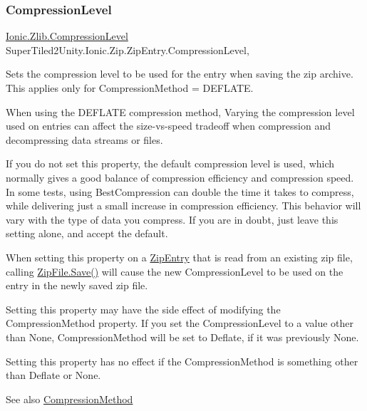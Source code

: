 \subsubsection{\texorpdfstring{Compression\+Level}{CompressionLevel}}
{\footnotesize\ttfamily \mbox{\hyperlink{namespace_super_tiled2_unity_1_1_ionic_1_1_zlib_a20f6771804996c363f454ad9765cd7db}{Ionic.\+Zlib.\+Compression\+Level}} Super\+Tiled2\+Unity.\+Ionic.\+Zip.\+Zip\+Entry.\+Compression\+Level\hspace{0.3cm}{\ttfamily [get]}, {\ttfamily [set]}}



Sets the compression level to be used for the entry when saving the zip archive. This applies only for Compression\+Method = D\+E\+F\+L\+A\+TE. 

When using the D\+E\+F\+L\+A\+TE compression method, Varying the compression level used on entries can affect the size-\/vs-\/speed tradeoff when compression and decompressing data streams or files. 

If you do not set this property, the default compression level is used, which normally gives a good balance of compression efficiency and compression speed. In some tests, using {\ttfamily Best\+Compression} can double the time it takes to compress, while delivering just a small increase in compression efficiency. This behavior will vary with the type of data you compress. If you are in doubt, just leave this setting alone, and accept the default. 

When setting this property on a {\ttfamily \mbox{\hyperlink{class_super_tiled2_unity_1_1_ionic_1_1_zip_1_1_zip_entry}{Zip\+Entry}}} that is read from an existing zip file, calling {\ttfamily \mbox{\hyperlink{class_super_tiled2_unity_1_1_ionic_1_1_zip_1_1_zip_file_aff8f1b3d07b66481e2629b04017a056f}{Zip\+File.\+Save()}}} will cause the new {\ttfamily Compression\+Level} to be used on the entry in the newly saved zip file. 

Setting this property may have the side effect of modifying the {\ttfamily Compression\+Method} property. If you set the {\ttfamily Compression\+Level} to a value other than {\ttfamily None}, {\ttfamily Compression\+Method} will be set to {\ttfamily Deflate}, if it was previously {\ttfamily None}. 

Setting this property has no effect if the {\ttfamily Compression\+Method} is something other than {\ttfamily Deflate} or {\ttfamily None}. 

\begin{DoxySeeAlso}{See also}
\mbox{\hyperlink{class_super_tiled2_unity_1_1_ionic_1_1_zip_1_1_zip_entry_a8d566d136931133f42c0d6ef62c32f2c}{Compression\+Method}}


\end{DoxySeeAlso}
\mbox{\label{class_super_tiled2_unity_1_1_ionic_1_1_zip_1_1_zip_entry_a8d566d136931133f42c0d6ef62c32f2c}} 
